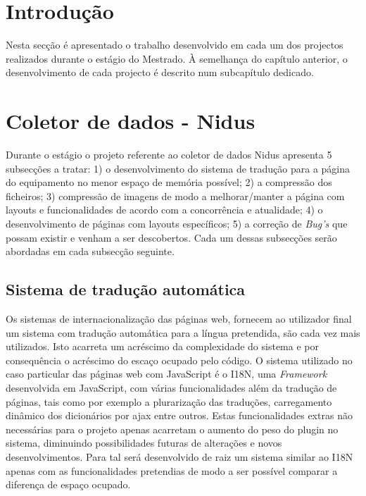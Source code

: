 \section{Introdução}
Nesta secção é apresentado  o trabalho desenvolvido em cada um dos projectos realizados durante o estágio do Mestrado. À semelhança do capítulo anterior, o desenvolvimento de cada projecto é descrito num subcapítulo dedicado.



\section{Coletor de dados - Nidus} 
\par Durante o estágio o projeto referente ao coletor de dados Nidus apresenta 5 subsecções a tratar: 1) o desenvolvimento do sistema de tradução para a página do equipamento no menor espaço de memória possível; 2) a compressão dos ficheiros; 3) compressão de imagens de modo a melhorar/manter a página com layouts e funcionalidades de acordo com a concorrência e atualidade; 4) o desenvolvimento de páginas com layouts específicos; 5) a correção de \textit{Bug's} que possam existir e venham a ser descobertos. Cada um dessas subsecções serão abordadas em cada subsecção seguinte.

\subsection{Sistema de tradução automática}\label{myi18n}
\par Os sistemas de internacionalização das páginas web, fornecem ao utilizador final um sistema com tradução automática para a língua pretendida, são cada vez mais utilizados. Isto acarreta um acréscimo da complexidade do sistema e por consequência o acréscimo do escaço ocupado pelo código. O sistema utilizado no caso particular das páginas web com JavaScript é o I18N, uma \textit{Framework} desenvolvida em JavaScript, com várias funcionalidades além da tradução de páginas, tais como por exemplo a plurarização das traduções, carregamento dinâmico dos dicionários por ajax entre outros. Estas funcionalidades extras não necessárias para o projeto apenas acarretam o aumento do peso do plugin no sistema, diminuindo possibilidades futuras de alterações e novos desenvolvimentos. Para tal será desenvolvido de raiz um sistema similar ao I18N apenas com as funcionalidades pretendias de modo a ser possível comparar a diferença de espaço ocupado.



